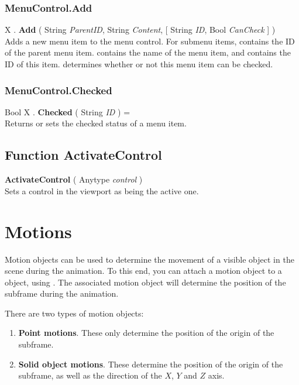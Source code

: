 \subsubsection{MenuControl.Add \label{F:MenuControl:Add}}
X . \textbf{Add} ( String \textit{ParentID}, String \textit{Content},  [ String \textit{ID}, Bool \textit{CanCheck} ] ) \\
Adds a new menu item to the menu control. For submenu items,  contains the ID of the parent menu item.  contains the name of the menu item, and  contains the ID of this item.  determines whether or not this menu item can be checked.

\subsubsection{MenuControl.Checked \label{F:MenuControl:Checked}}
Bool X . \textbf{Checked} ( String \textit{ID} ) = \\
Returns or sets the checked status of a menu item.

\subsection{Function ActivateControl \label{F:ActivateControl}}
\textbf{ActivateControl} ( Anytype \textit{control} ) \\
Sets a control in the viewport as being the active one.

\section{Motions \label{Motions}}
Motion objects can be used to determine the movement of a visible object in the scene during the animation. To this end, you can attach a motion object to a  object, using . The associated motion object will determine the position of the subframe during the animation.

There are two types of motion objects:
\begin{enumerate}
\item
\textbf{Point motions}.
These only determine the position of the origin of the subframe.
\item
\textbf{Solid object motions}.
These determine the position of the origin of the subframe, as well as the direction of the $X$, $Y$ and $Z$ axis.
\end{enumerate}


